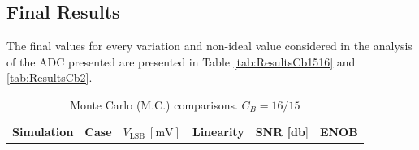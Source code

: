\subsection{Final Results}

The final values for every variation and non-ideal value considered in the analysis of the ADC presented are presented in Table \ref{tab:ResultsCb1516} and \ref{tab:ResultsCb2}.

\begin{table}[H]
    \centering
    \caption{Monte Carlo (M.C.) comparisons. $C_B = 16/15$}
    \begin{tabularx}{\textwidth}{
      >{\centering\arraybackslash}X 
      >{\centering\arraybackslash}X 
      >{\centering\arraybackslash}X 
      >{\centering\arraybackslash}X 
      >{\centering\arraybackslash}X
      >{\centering\arraybackslash}X
    }
    \toprule
    \textbf{Simulation} & \textbf{Case} & \textbf{$V_{\text{LSB}}~[\si{\milli\volt}]$} & \textbf{Linearity} & \textbf{SNR [\si{\decibel}}] & \textbf{ENOB} \\


\end{tabularx}
\end{table}
